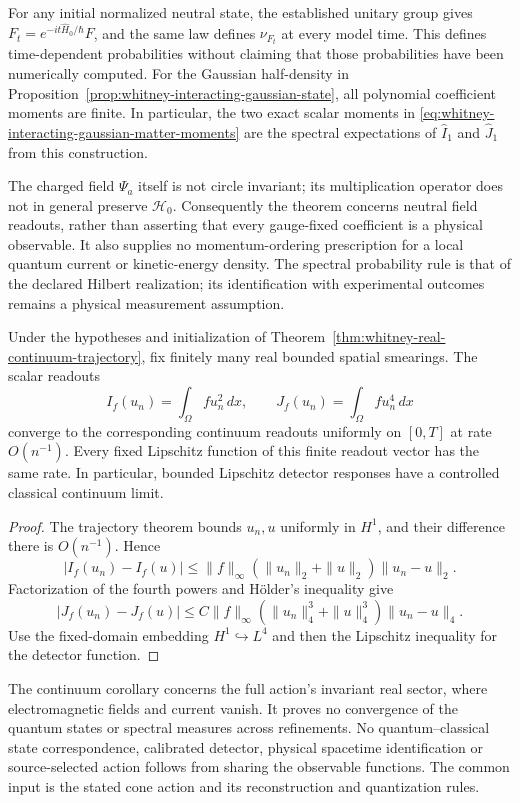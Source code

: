 For any initial normalized neutral state, the established unitary group
gives \(F_t=e^{-it\widehat H_0/\hbar}F\), and the same law defines
\(\nu_{F_t}\) at every model time. This defines time-dependent
probabilities without claiming that those probabilities have been
numerically computed. For the Gaussian half-density in
Proposition~\ref{prop:whitney-interacting-gaussian-state}, all polynomial
coefficient moments are finite. In particular, the two exact scalar
moments in \eqref{eq:whitney-interacting-gaussian-matter-moments} are
the spectral expectations of \(\widehat I_1\) and \(\widehat J_1\)
from this construction.

The charged field \(\Psi_a\) itself is not circle invariant; its
multiplication operator does not in general preserve \(\mathcal H_0\).
Consequently the theorem concerns neutral field readouts, rather than
asserting that every gauge-fixed coefficient is a physical observable.
It also supplies no momentum-ordering prescription for a local quantum
current or kinetic-energy density. The spectral probability rule is that
of the declared Hilbert realization; its identification with experimental
outcomes remains a physical measurement assumption.

\begin{proposition}
\label{cor:whitney-continuum-detector-readouts}
Under the hypotheses and initialization of
Theorem~\ref{thm:whitney-real-continuum-trajectory}, fix finitely many real
bounded spatial smearings. The scalar readouts
\[
 I_f(u_n)=\int_\Omega f u_n^2\,dx,\qquad
 J_f(u_n)=\int_\Omega f u_n^4\,dx
\]
converge to the corresponding continuum readouts uniformly on \([0,T]\)
at rate \(O(n^{-1})\). Every fixed Lipschitz function of this finite
readout vector has the same rate. In particular, bounded Lipschitz
detector responses have a controlled classical continuum limit.
\end{proposition}
\begin{proof}
The trajectory theorem bounds \(u_n,u\) uniformly in \(H^1\), and
their difference there is \(O(n^{-1})\). Hence
\[
 |I_f(u_n)-I_f(u)|
 \leq\|f\|_\infty(\|u_n\|_2+\|u\|_2)\|u_n-u\|_2.
\]
Factorization of the fourth powers and H\"older's inequality give
\[
 |J_f(u_n)-J_f(u)|
 \leq C\|f\|_\infty(\|u_n\|_4^3+\|u\|_4^3)
                                      \|u_n-u\|_4.
\]
Use the fixed-domain embedding \(H^1\hookrightarrow L^4\) and then
the Lipschitz inequality for the detector function.
\end{proof}

The continuum corollary concerns the full action's invariant real sector,
where electromagnetic fields and current vanish. It proves no convergence
of the quantum states or spectral measures across refinements. No
quantum--classical state correspondence, calibrated detector, physical
spacetime identification or source-selected action follows from sharing
the observable functions. The common input is the stated cone action and
its reconstruction and quantization rules.
